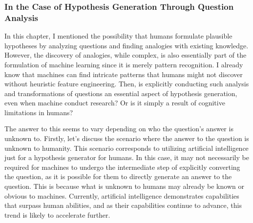 \subsubsection{In the Case of Hypothesis Generation Through Question Analysis}

In this chapter, I mentioned the possibility that humans formulate plausible hypotheses by analyzing questions and finding analogies with existing knowledge. However, the discovery of analogies, while complex, is also essentially part of the formulation of machine learning since it is merely pattern recognition. I already know that machines can find intricate patterns that humans might not discover without heuristic feature engineering. Then, is explicitly conducting such analysis and transformations of questions an essential aspect of hypothesis generation, even when machine conduct research? Or is it simply a result of cognitive limitations in humans?

The answer to this seems to vary depending on who the question's answer is unknown to. Firstly, let's discuss the scenario where the answer to the question is unknown to humanity. This scenario corresponds to utilizing artificial intelligence just for a hypothesis generator for humans. In this case, it may not necessarily be required for machines to undergo the intermediate step of explicitly converting the question, as it is possible for them to directly generate an answer to the question. This is because what is unknown to humans may already be known or obvious to machines. Currently, artificial intelligence demonstrates capabilities that surpass human abilities, and as their capabilities continue to advance, this trend is likely to accelerate further.

